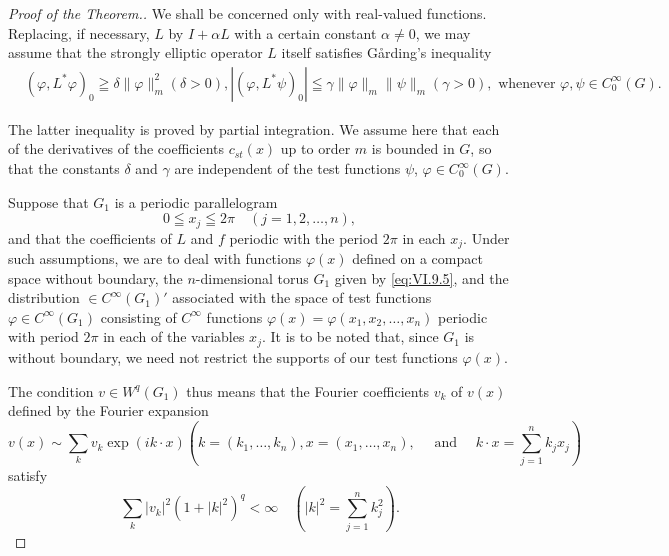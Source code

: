 \begin{proof}[Proof of the Theorem.]
We shall be concerned only with real-valued functions. Replacing, if necessary, $L$ by $I + \alpha L$ with a certain constant $\alpha \neq 0$, we may assume that the strongly elliptic operator $L$ itself satisfies Gårding's inequality
\begin{equation}\label{eq:VI.9.4}
\begin{aligned}
&(\varphi , L ^{*} \varphi) _{0} \geqq \delta \| \varphi \| _{m} ^{2} (\delta > 0), | (\varphi , L ^{*} \psi) _{0} | \leqq \gamma \| \varphi \| _{m} \| \psi \| _{m} (\gamma > 0), \text{ whenever } \varphi , \psi \in C _{0} ^{\infty} (G).
\end{aligned}
\end{equation}

The latter inequality is proved by partial integration. We assume here that each of the derivatives of the coefficients $c_{st}(x)$ up to order $m$ is bounded in $G$, so that the constants $\delta$ and $\gamma$ are independent of the test functions $\psi$, $\varphi \in C_{0}^{\infty}(G)$. 

Suppose that $G_{1}$ is a periodic parallelogram 
\begin{equation}\label{eq:VI.9.5}
0 \leqq x _{j} \leqq 2 \pi \quad (j = 1, 2, \dots , n),
\end{equation}
and that the coefficients of $L$ and $f$ periodic with the period $2\pi$ in each $x_{j}$. Under such assumptions, we are to deal with functions $\varphi(x)$ defined on a compact space without boundary, the $n$-dimensional torus $G_{1}$ given by \eqref{eq:VI.9.5}, and the distribution $\in C^{\infty}(G_{1})'$ associated with the space of test functions $\varphi \in C^{\infty}(G_{1})$ consisting of $C^{\infty}$ functions $\varphi(x) = \varphi(x_{1}, x_{2}, \ldots, x_{n})$ periodic with period $2\pi$ in each of the variables $x_{j}$. It is to be noted that, since $G_{1}$ is without boundary, we need not restrict the supports of our test functions $\varphi(x)$. 

The condition $v \in W^{q}(G_{1})$ thus means that the Fourier coefficients $v_{k}$ of $v(x)$ defined by the Fourier expansion 
\begin{equation}v (x) \sim \sum\limits_{k} v _{k} \exp (i k \cdot x) \left(k = \left(k _{1}, \dots , k _{n}\right), x = \left(x _{1}, \dots , x _{n}\right), \quad \text{ and } \quad k \cdot x = \sum\limits_{j=1} ^{n} k _{j} x _{j}\right) \label{eq:VI.9.6}\end{equation}
satisfy 
\begin{equation}\label{eq:VI.9.7}
\sum\limits_{k} \left| v _{k} \right| ^{2} (1 + | k | ^{2}) ^{q} < \infty \quad \left(| k | ^{2} = \sum\limits_{j=1} ^{n} k _{j} ^{2}\right).
\end{equation}


\end{proof}
